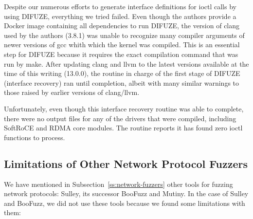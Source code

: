 Despite our numerous efforts to generate interface definitions for ioctl calls by using DIFUZE,
everything we tried failed. Even though the authors provide a Docker image containing all dependencies
to run DIFUZE, the version of clang used by the authors (3.8.1) was unable to recognize
many compiler arguments of newer versions of gcc whith which the kernel was compiled. This is an essential step
for DIFUZE because it requires the exact compilation command that was run by make.
After updating clang and llvm to the latest versions available at the time of this writing (13.0.0), the routine in charge of
the first stage of DIFUZE (interface recovery) ran until completion, albeit with many similar warnings
to those raised by earlier versions of clang/llvm.

Unfortunately, even though this interface recovery routine
was able to complete, there were no output files for any of the drivers that were compiled, including SoftRoCE and
RDMA core modules. The routine reports it has found zero ioctl functions to process.

\subsection{Limitations of Other Network Protocol Fuzzers}\label{ss:prob-nw-fuzzers}

We have mentioned in Subsection~\ref{ss:network-fuzzers} other tools for fuzzing network protocols: Sulley, its successor
BooFuzz and Mutiny. In the case of Sulley and
BooFuzz, we did not use these tools because we found some limitations with them:

